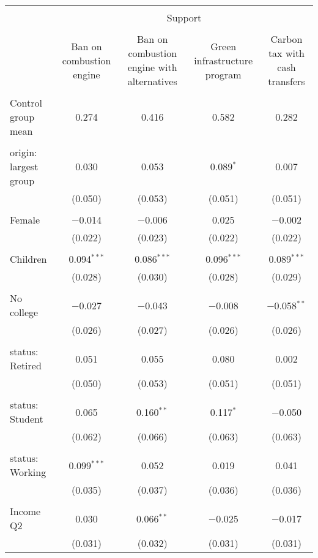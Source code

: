 
\begin{tabular}{@{\extracolsep{5pt}}lcccc} 
\\[-1.8ex]\hline 
\hline \\[-1.8ex] 
 & \multicolumn{4}{c}{Support} \\ 
\cline{2-5} 
\\[-1.8ex] & Ban on combustion engine & Ban on combustion engine with alternatives & Green infrastructure program & Carbon tax with cash transfers \\ 
\hline \\[-1.8ex] 
 Control group mean & 0.274 & 0.416 & 0.582 & 0.282  \\ \hline \\[-1.8ex] origin: largest group & 0.030 & 0.053 & 0.089$^{*}$ & 0.007 \\ 
  & (0.050) & (0.053) & (0.051) & (0.051) \\ 
  & & & & \\ 
 Female & $-$0.014 & $-$0.006 & 0.025 & $-$0.002 \\ 
  & (0.022) & (0.023) & (0.022) & (0.022) \\ 
  & & & & \\ 
 Children & 0.094$^{***}$ & 0.086$^{***}$ & 0.096$^{***}$ & 0.089$^{***}$ \\ 
  & (0.028) & (0.030) & (0.028) & (0.029) \\ 
  & & & & \\ 
 No college & $-$0.027 & $-$0.043 & $-$0.008 & $-$0.058$^{**}$ \\ 
  & (0.026) & (0.027) & (0.026) & (0.026) \\ 
  & & & & \\ 
 status: Retired & 0.051 & 0.055 & 0.080 & 0.002 \\ 
  & (0.050) & (0.053) & (0.051) & (0.051) \\ 
  & & & & \\ 
 status: Student & 0.065 & 0.160$^{**}$ & 0.117$^{*}$ & $-$0.050 \\ 
  & (0.062) & (0.066) & (0.063) & (0.063) \\ 
  & & & & \\ 
 status: Working & 0.099$^{***}$ & 0.052 & 0.019 & 0.041 \\ 
  & (0.035) & (0.037) & (0.036) & (0.036) \\ 
  & & & & \\ 
 Income Q2 & 0.030 & 0.066$^{**}$ & $-$0.025 & $-$0.017 \\ 
  & (0.031) & (0.032) & (0.031) & (0.031) \\ 

\end{tabular}
